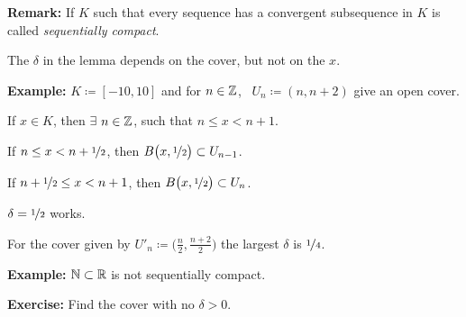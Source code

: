 \documentclass[10pt,aspectratio=169]{beamer}
\begin{document}
\begin{frame}

\textbf{Remark:} If $K$ such that every sequence has a convergent subsequence in
$K$ is called \emph{sequentially compact}.

\pause
\medskip

The $\delta$ in the lemma depends on the cover, but not on the $x$.

\pause
\medskip

\textbf{Example:} $K \coloneqq [-10,10]$ and for $n \in {\mathbb{Z}}$,~
$U_n \coloneqq (n,n+2)$ give an open cover.

\pause
If $x \in K$, then $\exists$ $n \in {\mathbb{Z}}$, such that $n \leq x < n+1$.

\pause
If $n \leq x < n+\nicefrac{1}{2}$, then
$B\bigl(x,\nicefrac{1}{2}\bigr) \subset U_{n-1}$.

\pause
If $n+ \nicefrac{1}{2} \leq x < n+1$, then
$B\bigl(x,\nicefrac{1}{2}\bigr) \subset U_{n}$.

\pause
\thus \quad $\delta = \nicefrac{1}{2}$ works.

\pause
\medskip

For the cover given by
$U'_n \coloneqq \bigl(\frac{n}{2},\frac{n+2}{2} \bigr)$
the largest $\delta$ is
$\nicefrac{1}{4}$.

\pause
\medskip

\textbf{Example:}
${\mathbb{N}} \subset {\mathbb{R}}$ is not sequentially compact.

\pause
\textbf{Exercise:} Find the cover with no $\delta > 0$.

\end{frame}
\end{document}

